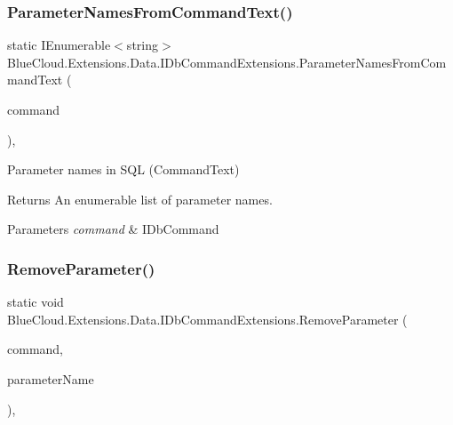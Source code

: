 \subsubsection{\texorpdfstring{Parameter\+Names\+From\+Command\+Text()}{ParameterNamesFromCommandText()}}
{\footnotesize\ttfamily static I\+Enumerable$<$string$>$ Blue\+Cloud.\+Extensions.\+Data.\+I\+Db\+Command\+Extensions.\+Parameter\+Names\+From\+Command\+Text (\begin{DoxyParamCaption}\item[{this I\+Db\+Command}]{command }\end{DoxyParamCaption})\hspace{0.3cm}{\ttfamily [inline]}, {\ttfamily [static]}}



Parameter names in S\+QL (Command\+Text) 

\begin{DoxyReturn}{Returns}
An enumerable list of parameter names.
\end{DoxyReturn}

\begin{DoxyParams}{Parameters}
{\em command} & I\+Db\+Command\\
\hline
\end{DoxyParams}
\mbox{\label{class_blue_cloud_1_1_extensions_1_1_data_1_1_i_db_command_extensions_af7e1bd2cfb81e60899ca6aec80b3f56a}} 
\subsubsection{\texorpdfstring{Remove\+Parameter()}{RemoveParameter()}}
{\footnotesize\ttfamily static void Blue\+Cloud.\+Extensions.\+Data.\+I\+Db\+Command\+Extensions.\+Remove\+Parameter (\begin{DoxyParamCaption}\item[{this I\+Db\+Command}]{command,  }\item[{string}]{parameter\+Name }\end{DoxyParamCaption})\hspace{0.3cm}{\ttfamily [inline]}, {\ttfamily [static]}}



